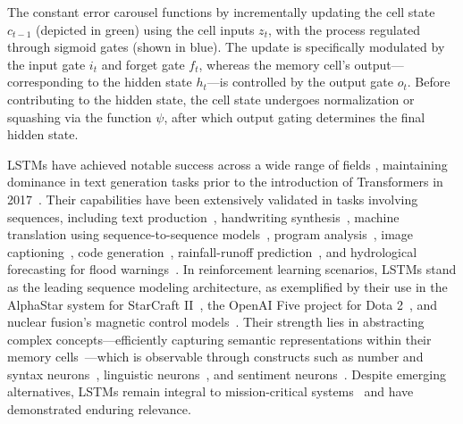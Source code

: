 The constant error carousel functions by incrementally updating the cell state $c_{t-1}$ (depicted in green) using the cell inputs $z_t$, with the process regulated through sigmoid gates (shown in blue). The update is specifically modulated by the input gate $i_t$ and forget gate $f_t$, whereas the memory cell’s output—corresponding to the hidden state $h_t$—is controlled by the output gate $o_t$. Before contributing to the hidden state, the cell state undergoes normalization or squashing via the function $\psi$, after which output gating determines the final hidden state.

LSTMs have achieved notable success across a wide range of fields \citep{Hochreiter:01,Hochreiter:07,Schmidhuber:15}, maintaining dominance in text generation tasks prior to the introduction of Transformers in 2017~\citep{Vaswani:17}. Their capabilities have been extensively validated in tasks involving sequences, including text production~\citep{Graves:13,Karpathy:15blog}, handwriting synthesis~\citep{Graves:13}, machine translation using sequence-to-sequence models~\citep{Sutskever:14nips}, program analysis~\citep{Zaremba:14arxiv}, image captioning~\citep{Karpathy:15,Hossain:19}, code generation~\citep{Karpathy:15blog}, rainfall-runoff prediction~\citep{Kratzert:18,Kratzert:19}, and hydrological forecasting for flood warnings~\citep{Nearing:24}. In reinforcement learning scenarios, LSTMs stand as the leading sequence modeling architecture, as exemplified by their use in the AlphaStar system for StarCraft II~\citep{Vinyals:17short}, the OpenAI Five project for Dota 2~\citep{OpenAI:19}, and nuclear fusion’s magnetic control models~\citep{Degrave:22short}. Their strength lies in abstracting complex concepts—efficiently capturing semantic representations within their memory cells~\citep{Karpathy:15blog}—which is observable through constructs such as number and syntax neurons~\citep{Lakretz:19}, linguistic neurons~\citep{Bau:19}, and sentiment neurons~\citep{Radford:17arxiv}. Despite emerging alternatives, LSTMs remain integral to mission-critical systems~\citep{Degrave:22short,Nearing:24} and have demonstrated enduring relevance.


